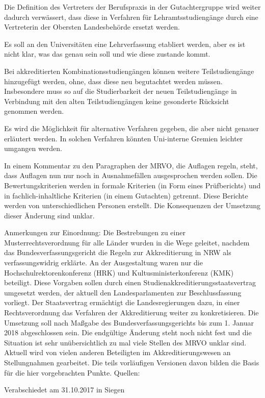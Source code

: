 \documentclass[DIV=calc]{scrartcl}
\begin{document}
\begin{compactitem}
\item Die Definition des Vertreters der Berufspraxis in der Gutachtergruppe wird weiter dadurch verwässert, dass diese in Verfahren für Lehramtsstudiengänge durch eine Vertreterin der Obersten Landesbehörde ersetzt werden.
\item Es soll an den Universitäten eine \glqq Lehrverfassung\grqq{} etabliert werden, aber es ist nicht klar, was das genau sein soll und wie diese zustande kommt.
\item Bei akkreditierten Kombinationsstudiengängen können weitere Teilstudiengänge hinzugefügt werden, ohne, dass diese neu begutachtet werden müssen. Insbesondere muss so auf die Studierbarkeit der neuen Teilstudiengänge in Verbindung mit den alten Teilstudiengängen keine gesonderte Rücksicht genommen werden.
\item Es wird die Möglichkeit für alternative Verfahren gegeben, die aber nicht genauer erläutert werden. In solchen Verfahren könnten Uni-interne Gremien leichter umgangen werden.
\item In einem Kommentar zu den Paragraphen der MRVO, die Auflagen regeln, steht, dass Auflagen nun nur noch in Ausnahmefällen ausgesprochen werden sollen. Die Bewertungskriterien werden in formale Kriterien (in Form eines Prüfberichts) und in fachlich-inhaltliche Kriterien (in einem Gutachten) getrennt. Diese Berichte werden von unterschiedlichen Personen erstellt. Die Konsequenzen der Umsetzung dieser Änderung sind unklar.
\end{compactitem}

Anmerkungen zur Einordnung:
Die Bestrebungen zu einer Musterrechtsverordnung für alle Länder wurden in die Wege geleitet, nachdem das Bundesverfassungsgericht die Regeln zur Akkreditierung in NRW als verfassungswidrig erklärte. An der Ausgestaltung waren nur die Hochschulrektorenkonferenz (HRK) und Kultusministerkonferenz (KMK) beteiligt.
Diese Vorgaben sollen durch einen Studienakkreditierungsstaatsvertrag umgesetzt werden, der aktuell den Landesparlamenten zur Beschlussfassung vorliegt. Der Staatsvertrag ermächtigt die Landesregierungen dazu, in einer Rechtsverordnung das Verfahren der Akkreditierung weiter zu konkretisieren. Die Umsetzung soll nach Maßgabe des Bundesverfassungsgerichts bis zum 1. Januar 2018 abgeschlossen sein. Die endgültige Änderung steht noch nicht fest und die Situation ist sehr unübersichtlich zu mal viele Stellen des MRVO unklar sind.
Aktuell wird von vielen anderen Beteiligten im Akkreditierungswesen an Stellungnahmen gearbeitet. Die teils vorläufigen Versionen davon bilden die Basis für die hier vorgebrachten Punkte.
Quellen:

\vspace{-0.5\baselineskip}
    \begin{flushright}
        Verabschiedet am 31.10.2017 in Siegen
    \end{flushright}
\end{document}
